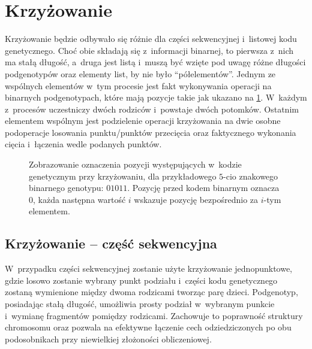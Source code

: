 \section{Krzyżowanie}
\label{sec:crossover}
Krzyżowanie będzie odbywało się różnie dla części
sekwencyjnej i~listowej kodu genetycznego.
Choć obie składają się z~informacji binarnej,
to pierwsza z~nich ma stałą długość,
a~druga jest listą i~muszą być wzięte
pod uwagę różne długości podgenotypów oraz elementy list,
by nie było ``półelementów''.
Jednym ze wspólnych elementów w~tym procesie
jest fakt wykonywania operacji na binarnych podgenotypach,
które mają pozycje takie jak
ukazano na \cref{fig:bin_gen}.
W~każdym z~procesów uczestniczy dwóch
rodziców i~powstaje dwóch potomków.
Ostatnim elementem wspólnym jest podzielenie
operacji krzyżowania na dwie osobne podoperacje
losowania punktu/punktów przecięcia
oraz faktycznego wykonania cięcia
i~łączenia wedle podanych punktów.

\begin{figure}
  \centering
  
  \caption{
    Zobrazowanie oznaczenia pozycji występujących
    w~kodzie genetycznym przy krzyżowaniu,
    dla przykładowego $5$-cio znakowego
    binarnego genotypu: $01011$.
    Pozycję przed kodem binarnym oznacza $0$,
    każda następna wartość $i$ wskazuje pozycję
    bezpośrednio za $i$-tym elementem.
  }
  \label{fig:bin_gen}
\end{figure}

\subsection{Krzyżowanie -- część sekwencyjna}
\label{subsec:crossover_seq}
W~przypadku części sekwencyjnej zostanie
użyte krzyżowanie jednopunktowe,
gdzie losowo zostanie wybrany punkt podziału
i~części kodu genetycznego zostaną wymienione
między dwoma rodzicami tworząc parę dzieci.
Podgenotyp, posiadając stałą długość,
umożliwia prosty podział w~wybranym punkcie
i~wymianę fragmentów pomiędzy rodzicami.
Zachowuje to poprawność struktury chromosomu
oraz pozwala na efektywne łączenie cech
odziedziczonych po obu podosobnikach
przy niewielkiej złożoności obliczeniowej.

